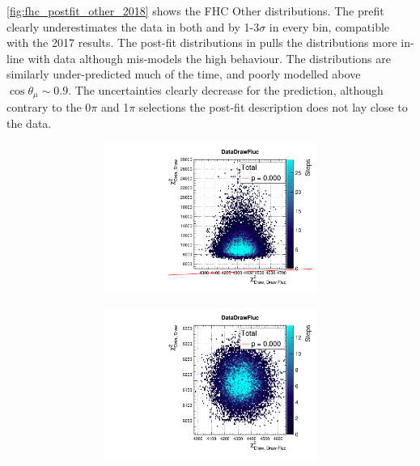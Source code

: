 \autoref{fig:fhc_postfit_other_2018} shows the FHC Other distributions. The prefit clearly underestimates the data in both \pmu and \cosmu by 1-3$\sigma$ in every bin, compatible with the 2017 results. The post-fit distributions in \pmu pulls the distributions more in-line with data although mis-models the high \pmu behaviour. The \cosmu distributions are similarly under-predicted much of the time, and poorly modelled above $\cos\theta_\mu \sim 0.9$. The uncertainties clearly decrease for the prediction, although contrary to the 0$\pi$ and 1$\pi$ selections the post-fit description does not lay close to the data.
\begin{figure}[h]
	\begin{subfigure}[t]{\textwidth}
		\begin{subfigure}[t]{0.24\textwidth}
			\includegraphics[width=\textwidth, trim={0mm 0mm 0mm 8mm}, clip,page=28]{figures/mach3/2018/data/2018a_FixedCov_RedCov_Mpi_Data_merge_PriorPred_procs}
		\end{subfigure}
		\begin{subfigure}[t]{0.24\textwidth}
			\includegraphics[width=\textwidth, trim={0mm 0mm 0mm 8mm}, clip,page=28]{figures/mach3/2018/data/2018a_FixedCov_RedCov_Mpi_Data_merge_PostPredStore_FullLLH_procs}

\end{subfigure}
\end{subfigure}
\end{figure}
